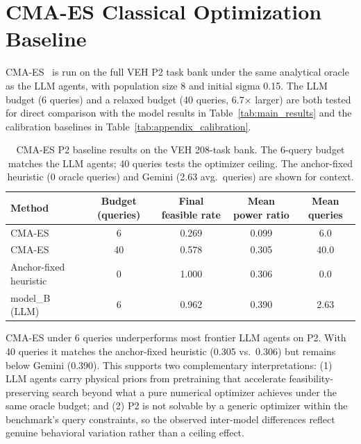 \section{CMA-ES Classical Optimization Baseline}

CMA-ES~\citep{hansen2023cma} is run on the full VEH P2 task bank under the same analytical oracle as the LLM agents, with population size 8 and initial sigma 0.15. The LLM budget (6 queries) and a relaxed budget (40 queries, 6.7$\times$ larger) are both tested for direct comparison with the model results in Table~\ref{tab:main_results} and the calibration baselines in Table~\ref{tab:appendix_calibration}.

\begin{table}[t]
\caption{CMA-ES P2 baseline results on the VEH 208-task bank. The 6-query budget matches the LLM agents; 40 queries tests the optimizer ceiling. The anchor-fixed heuristic (0 oracle queries) and Gemini (2.63 avg.\ queries) are shown for context.}
\label{tab:appendix_cmaes_p2}
\centering
\small
\begin{tabular}{lcccc}
\toprule
Method & Budget (queries) & Final feasible rate & Mean power ratio & Mean queries \\
\midrule
CMA-ES & 6 & 0.269 & 0.099 & 6.0 \\
CMA-ES & 40 & 0.578 & 0.305 & 40.0 \\
Anchor-fixed heuristic & 0 & 1.000 & 0.306 & 0.0 \\
model_B (LLM) & 6 & 0.962 & 0.390 & 2.63 \\
\bottomrule
\end{tabular}
\end{table}

CMA-ES under 6 queries underperforms most frontier LLM agents on P2. With 40 queries it matches the anchor-fixed heuristic (0.305 vs.\ 0.306) but remains below Gemini (0.390). This supports two complementary interpretations: (1) LLM agents carry physical priors from pretraining that accelerate feasibility-preserving search beyond what a pure numerical optimizer achieves under the same oracle budget; and (2) P2 is not solvable by a generic optimizer within the benchmark's query constraints, so the observed inter-model differences reflect genuine behavioral variation rather than a ceiling effect.
